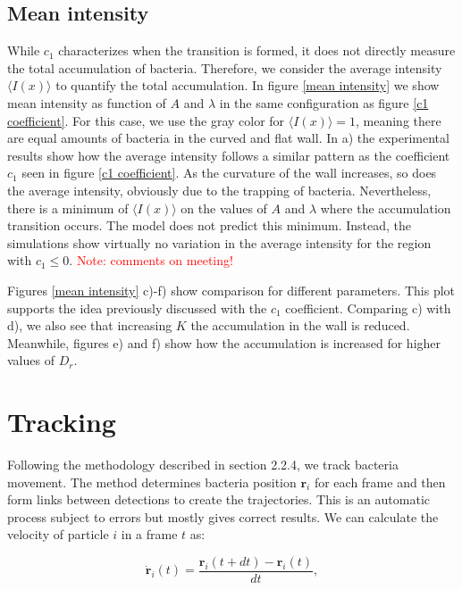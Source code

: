 \subsection{Mean intensity}

While $c_1$ characterizes when the transition is formed, it does not directly measure the total accumulation of bacteria. Therefore, we consider the average intensity $\langle I(x) \rangle$ to quantify the total accumulation. In figure \ref{mean intensity} we show mean intensity as function of $A$ and $\lambda$ in the same configuration as figure \ref{c1 coefficient}. For this case, we use the gray color for $\langle I(x) \rangle =1$, meaning there are equal amounts of bacteria in the curved and flat wall. In a) the experimental results show how the average intensity follows a similar pattern as the coefficient $c_1$ seen in figure \ref{c1 coefficient}. As the curvature of the wall increases, so does the average intensity, obviously due to the trapping of bacteria. Nevertheless, there is a minimum of $\langle I(x) \rangle$ on the values of $A$ and $\lambda$ where the accumulation transition occurs. The model does not predict this minimum. Instead, the simulations show virtually no variation in the average intensity for the region with $c_1\leq0$. \textcolor{red}{Note: comments on meeting!} 

Figures \ref{mean intensity} c)-f) show comparison for different parameters. This plot supports the idea previously discussed with the $c_1$ coefficient. Comparing c) with d), we also see that increasing $K$ the accumulation in the wall is reduced. Meanwhile, figures e) and f) show how the accumulation is increased for higher values of $D_r$.

\label{section: tracking}
\section{Tracking}

Following the methodology described in section 2.2.4, we track bacteria movement. The method determines bacteria position $\textbf{r}_i$ for each frame and then form links between detections to create the trajectories. This is an automatic process subject to errors but mostly gives correct results. We can calculate the velocity of particle $i$ in a frame $t$ as:

\begin{equation}
    \dot{\textbf{r}}_i(t) =  \frac{\textbf{r}_i(t+dt)-\textbf{r}_i(t)}{dt},
\end{equation}

